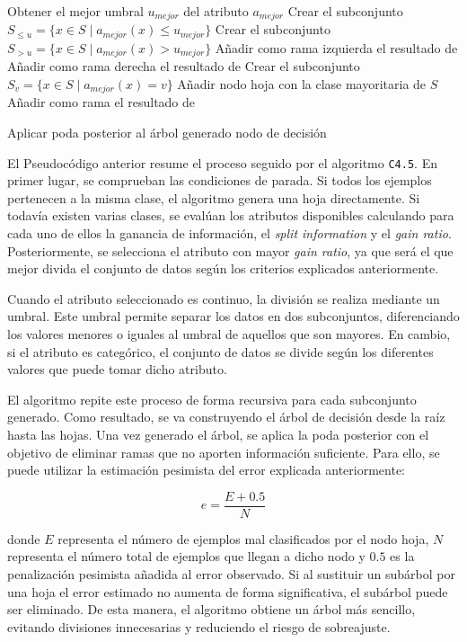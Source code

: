 \begin{algorithm}[H]
\begin{algorithmic}[1]
    \State Obtener el mejor umbral $u_{mejor}$ del atributo $a_{mejor}$
    \State Crear el subconjunto $S_{\leq u} = \{x \in S \mid a_{mejor}(x) \leq u_{mejor}\}$
    \State Crear el subconjunto $S_{>u} = \{x \in S \mid a_{mejor}(x) > u_{mejor}\}$
    \State Añadir como rama izquierda el resultado de 
    \State Añadir como rama derecha el resultado de 
\Else
        \State Crear el subconjunto $S_v = \{x \in S \mid a_{mejor}(x) = v\}$
            \State Añadir nodo hoja con la clase mayoritaria de $S$
        \Else
            \State Añadir como rama el resultado de 
        \EndIf
    \EndFor
\EndIf

\State Aplicar poda posterior al árbol generado
\State \Return nodo de decisión

\EndFunction
\end{algorithmic}
\end{algorithm}

El Pseudocódigo anterior resume el proceso seguido por el algoritmo \texttt{C4.5}. En primer lugar, se comprueban las condiciones de parada. Si todos los ejemplos pertenecen a la misma clase, el algoritmo genera una hoja directamente. Si todavía existen varias clases, se evalúan los atributos disponibles calculando para cada uno de ellos la ganancia de información, el \textit{split information} y el \textit{gain ratio}. Posteriormente, se selecciona el atributo con mayor \textit{gain ratio}, ya que será el que mejor divida el conjunto de datos según los criterios explicados anteriormente.

Cuando el atributo seleccionado es continuo, la división se realiza mediante un umbral. Este umbral permite separar los datos en dos subconjuntos, diferenciando los valores menores o iguales al umbral de aquellos que son mayores. En cambio, si el atributo es categórico, el conjunto de datos se divide según los diferentes valores que puede tomar dicho atributo.

El algoritmo repite este proceso de forma recursiva para cada subconjunto generado. Como resultado, se va construyendo el árbol de decisión desde la raíz hasta las hojas. Una vez generado el árbol, se aplica la poda posterior con el objetivo de eliminar ramas que no aporten información suficiente. Para ello, se puede utilizar la estimación pesimista del error explicada anteriormente:

\begin{equation}
e = \frac{E + 0.5}{N}
\label{eq}
\end{equation}

donde $E$ representa el número de ejemplos mal clasificados por el nodo hoja, $N$ representa el número total de ejemplos que llegan a dicho nodo y $0.5$ es la penalización pesimista añadida al error observado. Si al sustituir un subárbol por una hoja el error estimado no aumenta de forma significativa, el subárbol puede ser eliminado. De esta manera, el algoritmo obtiene un árbol más sencillo, evitando divisiones innecesarias y reduciendo el riesgo de sobreajuste.

